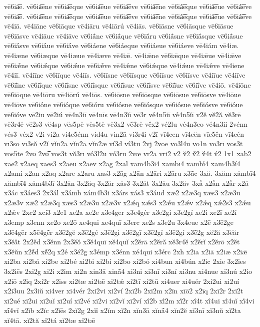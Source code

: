 {vē6ia͞e.
vē6ia͞ene
vē6ia͞eque
vē6ia͞eue
vē6ia͞eve
vē6iá͞ene
vē6iá͞eque
vē6iá͞eue
vē6iá͞eve
vē6ia͡e.
vē6ia͡ene
vē6ia͡eque
vē6ia͡eue
vē6ia͡eve
vē6iá͡ene
vē6iá͡eque
vē6iá͡eue
vē6iá͡eve
vē4iā.
vē4iāne
vē6iāque
vē4iāru
vē4iārú
vē4iās.
vē6iāsne
vē6iāsque
vē6iāsue
vē6iāsve
vē4iāue
vē4iāve
vē6iā́ne
vē6iā́que
vē6iā́ru
vē6iā́sne
vē6iā́sque
vē6iā́sue
vē6iā́sve
vē6iā́ue
vē6iā́ve
vē6iáene
vē6iáeque
vē6iáeue
vē6iáeve
vē4iám
vē4iæ.
vē4iæne
vē6iæque
vē4iæue
vē4iæve
vē4iǣ.
vē4iǣne
vē6iǣque
vē4iǣue
vē4iǣve
vē6iǣ́ne
vē6iǣ́que
vē6iǣ́ue
vē6iǣ́ve
vē4iǽne
vē6iǽque
vē4iǽue
vē4iǽve
vē4iene
vē4iī.
vē4iīne
vē6iīque
vē4iīs.
vē6iīsne
vē6iīsque
vē6iīsue
vē6iīsve
vē4iīue
vē4iīve
vē6iī́ne
vē6iī́que
vē6iī́sne
vē6iī́sque
vē6iī́sue
vē6iī́sve
vē6iī́ue
vē6iī́ve
vē4iō.
vē4iōne
vē6iōque
vē4iōru
vē4iōrú
vē4iōs.
vē6iōsne
vē6iōsque
vē6iōsue
vē6iōsve
vē4iōue
vē4iōve
vē6iṓne
vē6iṓque
vē6iṓru
vē6iṓsne
vē6iṓsque
vē6iṓsue
vē6iṓsve
vē6iṓue
vē6iṓve
vē2iu
vē2iú
vē4n3iī
vē4nīs
vē4n3ĭī
vē3r
vḗ4n5iī
vḗ4n5ĭī
v2ĕ
vĕ2ă
vĕ3rē
vĕ3r4ĕ
vĕ2s3
vĕ4sp
vĕs5pĕ
vĕs5tĕ
vĕ3x2
vĕ́3rĕ
vĕ́x2
vé2lu
vé4n3eo
vé4n3ii
2vénn
vés3
véx2
v2i
vi2a
vi4c5énn
vid4u
vin2ā
vi3r4i
v2ī
vī4cen
vī4cĕn
vīc5ĕ́n
vī4cén
vī3so
vī3sŏ
v2ĭ
vĭn2a
vĭn2ā
vĭn2æ
ví3d
ví3tu
2vj
2voe
vo3l4u
vo1n
vo3rī
vos3t
vos5te
2vo͞
2vo͡
vōs3t
vŏ3rī
vó3l2u
vó3ru
2vœ
vr2a
vri2
v̄2
v̆2
v̆́2
v̆́4t
v́2
1x1
xab2
xae2
x2aeq
xaes3
x2aeu
x2aev
x2ag
2xal
xam4b3i4
xambī4
xambī́4
xam4b3í4
x2ami
x2an
x2aq
x2are
x2aru
xas3
x2āg
x2ān
x2āri
x2āru
x3ā́c
3xă.
3xăm
xămbī4
xămbī́4
xăm4b3ĭ
3x2ăn
3x2ăq
3x2ăr
xăs3
3x2ăt
3x2ău
3x2ăv
3xắ
x2ắn
x2ắr
x2á
x3ác
x3áes3
2x3ál
x3ámb
xám4b3i
x3árs
xás3
x3áud
xæ2
x2æ3q
xæs3
x2æ3u
x2æ3v
xǣ2
x2ǣ3q
xǣs3
x2ǣ3u
x2ǣ3v
x2ǣ́q
xǣ́s3
x2ǣ́u
x2ǣ́v
x2ǽq
xǽ2s3
x2ǽu
x2ǽv
2xc2
xcí3
x2e1
xe2a
xe2e
x3e4ger
x3e4gér
x3e2gi
x3e2gí
xe2i
xe2ī
xe2í
x3emp
x3enn
xe2o
xe2ō
xe4qui
xe4quī
x3erc
xe2s
x3e2u
3x4eue
x2ē
x3ē2ge
x3ē4gēr
x5ē4gḗr
x3ē2gĕ
x3ē2gé
x3ē2gi
x3ē2gī
x3ē2gĭ
x3ē2gí
x3ḗ2g
xĕ2ă
x3ĕăr
x3ĕăt
2x2ĕd
x3ĕnn
2x3ĕŏ
x3ĕ4quī
xĕ4quĭ
x2ĕrā
x2ĕră
xĕ3r4ĕ
x2ĕrĭ
x2ĕrō
x2ĕt
x3ĕŭn
x2ĕ́d
xĕ́2q
x2é
x3é2g
x3émp
x3énn
xé4qui
x3érc
2xh
x2ia
x2iā
x2iæ
x2iǣ
xi2ba
xi2bá
xi2be
xi2bé
xi2bi
xi2bí
xi2bo
xi2bó
xi4bun
xi4bún
x2ic
2xie
3x2ies
3x2iēs
2xi2g
xi2i
x2im
xi2n
xin3ā
xinā́4
xi3ni
xi3nī
xi3ní
xi3nu
xi4nue
xi3nú
x2io
x2iō
x2iq
2xi2r
x2iss
xi2tæ
xi2tǣ
xi2tǽ
xi2tī
xi2tū
xi4uer
xi4uér
2xi2ui
xi2uí
x2i3uu
2x3iŭ
xi4ver
xi4vér
2xi2vi
xi2ví
2xī2b
2xī2m
x2īn
xīō2
x2īq
2xī2r
2xī2t
xī2ué
xī2ui
xī2uĭ
xī2uí
xī2vé
xī2vi
xī2vĭ
xī2ví
xī́2b
xī́2m
xī́2r
xī́4t
xī́4ui
xī́4uĭ
xī́4vi
xī́4vĭ
x2ĭb
x2ĭc
x2ĭēs
2xĭ2g
2xĭĭ
x2ĭm
xĭ2n
xĭn3ā
xĭnā́4
xĭn2ĕ
xĭ3nī
xĭ3nŭ
xĭ2ta
xĭ4tā.
xĭ2tă
xĭ2tá
xĭ2tæ
xĭ2tǣ
}
